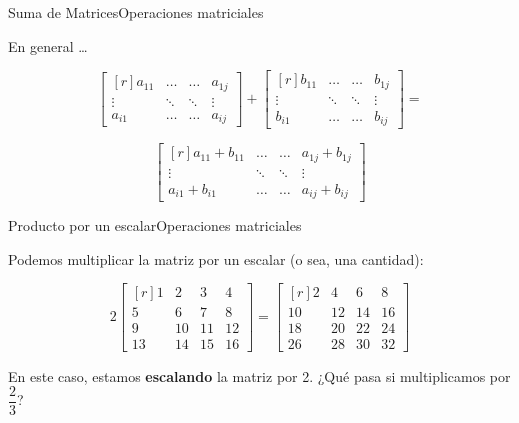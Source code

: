 \documentclass[spanish, c]{beamer}
\begin{document}
\begin{frame}{Suma de Matrices}{Operaciones matriciales}

    En general \dots

    \bigskip

    \[%
        \begin{bmatrix*}[r]
            a_{11} & \dots & \dots & a_{1j} \\
            \vdots & \ddots & \ddots & \vdots \\
            a_{i1} & \dots & \dots & a_{ij}
        \end{bmatrix*} +
        \begin{bmatrix*}[r]
            b_{11} & \dots & \dots & b_{1j} \\
            \vdots & \ddots & \ddots & \vdots \\
            b_{i1} & \dots & \dots & b_{ij}
        \end{bmatrix*} =  \]
        
        \bigskip

        \[
        \begin{bmatrix*}[r]
            a_{11}  + b_{11} & \dots & \dots & a_{1j}  + b_{1j} \\
            \vdots & \ddots & \ddots & \vdots \\
            a_{i1}  + b_{i1} & \dots & \dots & a_{ij}  + b_{ij}
        \end{bmatrix*} \]

\end{frame}

\begin{frame}{Producto por un escalar}{Operaciones matriciales}

    Podemos \alert{multiplicar} la matriz \alert{por un escalar} (o sea, una cantidad):

    \bigskip

    \[%
        2
        \begin{bmatrix*}[r]
            1 & 2 & 3 & 4 \\
            5 & 6 & 7 & 8 \\
            9 & 10 & 11 & 12 \\
            13 & 14 & 15 & 16
        \end{bmatrix*} =
    \begin{bmatrix*}[r]
       2 & 4 & 6 & 8 \\
       10 & 12 & 14 & 16 \\
       18 & 20 & 22 & 24 \\
       26 & 28 & 30 & 32
    \end{bmatrix*}
    \]

    En este caso, estamos \textbf{escalando} la matriz por 2. ¿Qué pasa si multiplicamos por $\dfrac{2}{3}$?
\end{frame}
\end{document}
